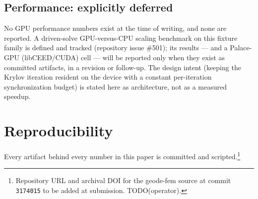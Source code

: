 \documentclass{anvil-paper}
\begin{document}
\subsection{Performance: explicitly deferred}

No GPU performance numbers exist at the time of writing, and none are
reported. A driven-solve GPU-versus-CPU scaling benchmark on this fixture
family is defined and tracked (repository issue \#501); its results ---
and a Palace-GPU (libCEED/CUDA) cell --- will be reported only when they
exist as committed artifacts, in a revision or follow-up. The design
intent (keeping the Krylov iteration resident on the device with a
constant per-iteration synchronization budget) is stated here as
architecture, not as a measured speedup.


\section{Reproducibility}
\label{sec:repro}

Every artifact behind every number in this paper is committed and
scripted.\footnote{Repository URL and archival DOI for the geode-fem
source at commit \texttt{3174015} to be added at submission.
TODO(operator).}
\end{document}
